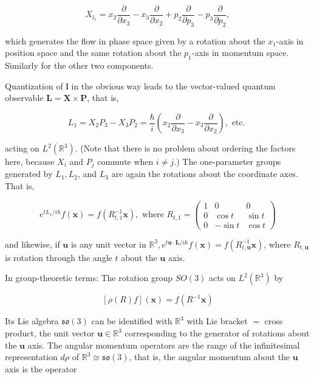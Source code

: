 \documentclass[10pt, letterpaper]{article}
\begin{document}
$$
X_{l_{1}}=x_{2} \frac{\partial}{\partial x_{3}}-x_{3} \frac{\partial}{\partial x_{2}}+p_{2} \frac{\partial}{\partial p_{3}}-p_{3} \frac{\partial}{\partial p_{2}},
$$

which generates the flow in phase space given by a rotation about the $x_{1}$-axis in position space and the same rotation about the $p_{1}$-axis in momentum space. Similarly for the other two components.

Quantization of $\mathbf{l}$ in the obvious way leads to the vector-valued quantum observable $\mathbf{L}=\mathbf{X} \times \mathbf{P}$, that is,

$$
L_{1}=X_{2} P_{3}-X_{3} P_{2}=\frac{\hbar}{i}\left(x_{2} \frac{\partial}{\partial x_{3}}-x_{3} \frac{\partial}{\partial x_{2}}\right), \text { etc. }
$$

acting on $L^{2}\left(\mathbb{R}^{3}\right)$. (Note that there is no problem about ordering the factors here, because $X_{i}$ and $P_{j}$ commute when $i \neq j$.) The one-parameter groups generated by $L_{1}, L_{2}$, and $L_{3}$ are again the rotations about the coordinate axes. That is,

$$
e^{t L_{1} / i \hbar} f(\mathbf{x})=f\left(R_{t, 1}^{-1} \mathbf{x}\right), \text { where } R_{t, 1}=\left(\begin{array}{ccc}
1 & 0 & 0 \\
0 & \cos t & \sin t \\
0 & -\sin t & \cos t
\end{array}\right)
$$

and likewise, if $\mathbf{u}$ is any unit vector in $\mathbb{R}^{3}, e^{t \mathbf{u} \cdot \mathbf{L} / i \hbar} f(\mathbf{x})=f\left(R_{t, \mathbf{u}}^{-1} \mathbf{x}\right)$, where $R_{t, \mathbf{u}}$ is rotation through the angle $t$ about the $\mathbf{u}$ axis.

In group-theoretic terms: The rotation group $S O(3)$ acts on $L^{2}\left(\mathbb{R}^{3}\right)$ by

$$
[\rho(R) f](\mathbf{x})=f\left(R^{-1} \mathbf{x}\right)
$$

Its Lie algebra $\mathfrak{s o}(3)$ can be identified with $\mathbb{R}^{3}$ with Lie bracket $=$ cross product, the unit vector $\mathbf{u} \in \mathbb{R}^{3}$ corresponding to the generator of rotations about the $\mathbf{u}$ axis. The angular momentum operators are the range of the infinitesimal representation $d \rho$ of $\mathbb{R}^{3} \cong \mathfrak{s o}(3)$, that is, the angular momentum about the $\mathbf{u}$ axis is the operator
\end{document}
